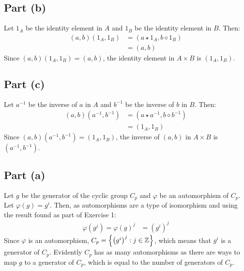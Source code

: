 \documentclass{article}
\begin{document}
\subsection*{Part (b)}
Let $1_A$ be the identity element in $A$ and $1_B$ be the identity element in $B$. Then:
\begin{equation}
    \begin{split}
        \left(a,b\right)\left(1_A,1_B\right) & = \left(a \star 1_A, b \diamond 1_B\right) \\
        & = \left(a, b\right)
    \end{split}
\end{equation}
Since $\left(a,b\right)\left(1_A,1_B\right) = \left(a, b\right)$, the identity element in $A \times B$ is $\left(1_A, 1_B\right)$. 
\subsection*{Part (c)}
Let $a^{-1}$ be the inverse of $a$ in $A$ and $b^{-1}$ be the inverse of $b$ in $B$. Then:
\begin{equation}
    \begin{split}
        \left(a,b\right)\left(a^{-1},b^{-1}\right) & = \left(a \star a^{-1}, b \diamond b^{-1}\right) \\
        & = \left(1_A, 1_B\right)
    \end{split}
\end{equation}
Since $\left(a,b\right)\left(a^{-1},b^{-1}\right) = \left(1_A, 1_B\right)$, the inverse of $\left(a, b\right)$ in $A \times B$ is $\left(a^{-1}, b^{-1}\right)$. 

\clearpage

\problem
\subsection*{Part (a)}
Let $g$ be the generator of the cyclic group $C_p$ and $\varphi$ be an automorphism of $C_p$. Let $\varphi\left(g\right) = g^i$. Then, as automorphisms are a type of isomorphism and using the result found as part of Exercise 1:
\begin{equation}
    \begin{split}
        \varphi\left(g^j\right) = \varphi\left(g\right)^j & = \left(g^i\right)^j
    \end{split}
\end{equation}
Since $\varphi$ is an automorphism, $C_p = \left\{\left(g^i\right)^j : j \in \mathbb{Z} \right\}$, which means that $g^i$ is a generator of $C_p$. Evidently $C_p$ has as many automorphisms as there are ways to map $g$ to a generator of $C_p$, which is equal to the number of generators of $C_p$.
\end{document}
